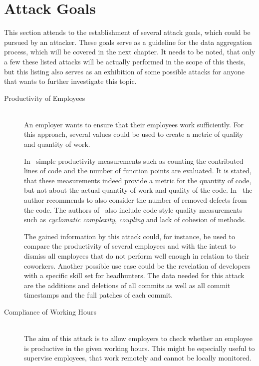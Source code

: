 \section{Attack Goals}\label{attack-goals}
This section attends to the establishment of several attack goals, which could be pursued by an attacker.
These goals serve as a guideline for the data aggregation process, which will be covered in the next chapter.
It needs to be noted, that only a few these listed attacks will be actually performed in the scope of this thesis, but this listing also serves as an exhibition of some possible attacks for anyone that wants to further investigate this topic.

\begin{description}
    \item[Productivity of Employees]~\label{attack:employer-monitoring} \hfill \\
        An employer wants to ensure that their employees work sufficiently.
        For this approach, several values could be used to create a metric of quality and quantity of work.

        In~\cite[p.~3]{article:job-productivity} simple productivity measurements such as counting the contributed lines of code and the number of function points are evaluated.
        It is stated, that these measurements indeed provide a metric for the quantity of code, but not about the actual quantity of work and quality of the code.
        In~\cite[p.~43]{article:measuring-programming-quality} the author recommends to also consider the number of removed defects from the code.
        The authors of~\cite[p.~257]{article:software-productivity} also include code style quality measurements such as \emph{cyclomatic complexity}, \emph{coupling} and lack of cohesion of methods.

        The gained information by this attack could, for instance, be used to compare the productivity of several employees and with the intent to dismiss all employees that do not perform well enough in relation to their coworkers.
        Another possible use case could be the revelation of developers with a specific skill set for headhunters.
        The data needed for this attack are the additions and deletions of all commits as well as all commit timestamps and the full patches of each commit.

    \item[Compliance of Working Hours] \hfill \\
        The aim of this attack is to allow employers to check whether an employee is productive in the given working hours.
        This might be especially useful to supervise employees, that work remotely and cannot be locally monitored.


\end{description}

